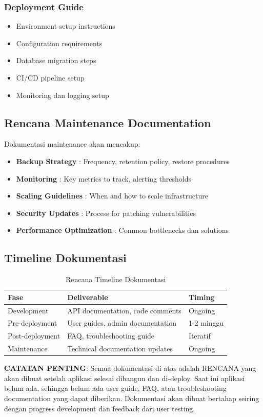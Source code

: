 \subsubsection{Deployment Guide}
\begin{itemize}[leftmargin=*]
    \item Environment setup instructions
    \item Configuration requirements
    \item Database migration steps
    \item CI/CD pipeline setup
    \item Monitoring dan logging setup
\end{itemize}

\subsection{Rencana Maintenance Documentation}

Dokumentasi maintenance akan mencakup:

\begin{itemize}[leftmargin=*]
    \item \textbf{Backup Strategy} : Frequency, retention policy, restore procedures
    \item \textbf{Monitoring} : Key metrics to track, alerting thresholds
    \item \textbf{Scaling Guidelines} : When and how to scale infrastructure
    \item \textbf{Security Updates} : Process for patching vulnerabilities
    \item \textbf{Performance Optimization} : Common bottlenecks dan solutions
\end{itemize}

\subsection{Timeline Dokumentasi}

\begin{table}[htbp]
\centering
\caption{Rencana Timeline Dokumentasi}
\label{tab:doc_timeline}
\begin{tabularx}{\textwidth}{|l|X|l|}
\hline
\textbf{Fase} & \textbf{Deliverable} & \textbf{Timing} \\
\hline
Development & API documentation, code comments & Ongoing \\
\hline
Pre-deployment & User guides, admin documentation & 1-2 minggu \\
\hline
Post-deployment & FAQ, troubleshooting guide & Iteratif \\
\hline
Maintenance & Technical documentation updates & Ongoing \\
\hline
\end{tabularx}
\end{table}

\textbf{CATATAN PENTING}: Semua dokumentasi di atas adalah RENCANA yang akan dibuat setelah aplikasi selesai dibangun dan di-deploy. Saat ini aplikasi belum ada, sehingga belum ada user guide, FAQ, atau troubleshooting documentation yang dapat diberikan. Dokumentasi akan dibuat bertahap seiring dengan progress development dan feedback dari user testing.
